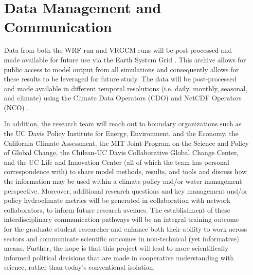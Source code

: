 \documentclass[11pt]{article}
\begin{document}
\setcounter{section}{1}

\section{Data Management and Communication}

Data from both the WRF run and VRGCM runs will be post-processed and made available for future use via the Earth System Grid \citep{williams2009earth}. This archive allows for public access to model output from all simulations and consequently allows for these results to be leveraged for future study.  The data will be post-processed and made available in different temporal resolutions (i.e. daily, monthly, seasonal, and climate) using the Climate Data Operators (CDO) and NetCDF Operators (NCO) \citep{schulzweida2007cdo,zender2006netcdf}.

In addition, the research team will reach out to boundary organizations such as the UC Davis Policy Institute for Energy, Environment, and the Economy, the California Climate Assessment, the MIT Joint Program on the Science and Policy of Global Change, the Chilean-UC Davis Collaborative Global Change Center, and the UC Life and Innovation Center (all of which the team has personal correspondence with) to share model methods, results, and tools and discuss how the information may be used within a climate policy and/or water management perspective.  Moreover, additional research questions and key management and/or policy hydroclimate metrics will be generated in collaboration with network collaborators, to inform future research avenues.  The establishment of these interdisciplinary communication pathways will be an integral training outcome for the graduate student researcher and enhance both their ability to work across sectors and communicate scientific outcomes in non-technical (yet informative) means.  Further, the hope is that this project will lead to more scientifically informed political decisions that are made in cooperative understanding with science, rather than today's conventional isolation.  

  
\end{document}
